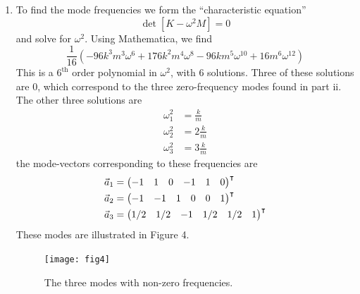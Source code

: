 \documentclass[12pt]{article}
\begin{document}
\begin{enumerate}[label=\roman*.]
    \item To find the mode frequencies we form the ``characteristic equation''
    \[ \det[K - \omega^2M] = 0 \]
    and solve for $\omega^2$. Using Mathematica, we find
    \[ \frac{1}{16}\left(-96k^3m^3\omega^6 + 176k^2m^4\omega^8 - 96km^5\omega^{10} + 16m^6\omega^{12}\right) \]
    This is a $6^\text{th}$ order polynomial in $\omega^2$, with 6 solutions. Three of these solutions are 0, which correspond to the three zero-frequency modes found in part ii. The other three solutions are
    \begin{align*}
        \omega_1^2 &= \frac{k}{m} \\
        \omega_2^2 &= 2\frac{k}{m} \\
        \omega_3^2 &= 3\frac{k}{m}
    \end{align*}
    the mode-vectors corresponding to these frequencies are
    \begin{align*}
        \vec{a}_1 &= \mqty(-1 & 1 & 0 & -1 & 1 & 0)^\intercal \\
        \vec{a}_2 &= \mqty(-1 & -1 & 1 & 0 & 0 & 1)^\intercal \\
        \vec{a}_3 &= \mqty(1/2 & 1/2 & -1 & 1/2 & 1/2 & 1)^\intercal
    \end{align*}
    These modes are illustrated in Figure 4.
    \begin{figure}[H]
        \texttt{[image: fig4]}
        \centering
        \caption{The three modes with non-zero frequencies.}
        \label{fig4}
    \end{figure}

\end{enumerate}
\end{document}
